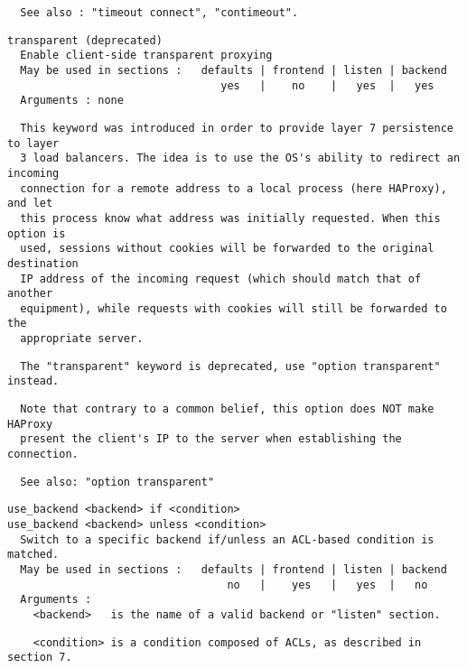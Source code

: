 \begin{verbatim}
  See also : "timeout connect", "contimeout".
\end{verbatim}

\begin{verbatim}
transparent (deprecated)
  Enable client-side transparent proxying
  May be used in sections :   defaults | frontend | listen | backend
                                 yes   |    no    |   yes  |   yes
  Arguments : none
\end{verbatim}

\begin{verbatim}
  This keyword was introduced in order to provide layer 7 persistence to layer
  3 load balancers. The idea is to use the OS's ability to redirect an incoming
  connection for a remote address to a local process (here HAProxy), and let
  this process know what address was initially requested. When this option is
  used, sessions without cookies will be forwarded to the original destination
  IP address of the incoming request (which should match that of another
  equipment), while requests with cookies will still be forwarded to the
  appropriate server.
\end{verbatim}

\begin{verbatim}
  The "transparent" keyword is deprecated, use "option transparent" instead.
\end{verbatim}

\begin{verbatim}
  Note that contrary to a common belief, this option does NOT make HAProxy
  present the client's IP to the server when establishing the connection.
\end{verbatim}

\begin{verbatim}
  See also: "option transparent"
\end{verbatim}

\begin{verbatim}
use_backend <backend> if <condition>
use_backend <backend> unless <condition>
  Switch to a specific backend if/unless an ACL-based condition is matched.
  May be used in sections :   defaults | frontend | listen | backend
                                  no   |    yes   |   yes  |   no
  Arguments :
    <backend>   is the name of a valid backend or "listen" section.
\end{verbatim}

\begin{verbatim}
    <condition> is a condition composed of ACLs, as described in section 7.
\end{verbatim}

